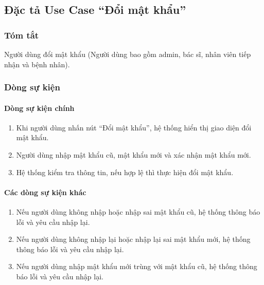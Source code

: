 \subsection{Đặc tả Use Case ``Đổi mật khẩu''}

\subsubsection{Tóm tắt}
Người dùng đổi mật khẩu (Người dùng bao gồm admin, bác sĩ, nhân viên tiếp nhận và bệnh nhân).

\subsubsection{Dòng sự kiện}
\paragraph{\textbf{Dòng sự kiện chính}}
\begin{enumerate}
    \item Khi người dùng nhấn nút ``Đổi mật khẩu'', hệ thống hiển thị giao diện đổi mật khẩu.
    \item Người dùng nhập mật khẩu cũ, mật khẩu mới và xác nhận mật khẩu mới.
    \item Hệ thống kiểm tra thông tin, nếu hợp lệ thì thực hiện đổi mật khẩu.
\end{enumerate}

\paragraph{\textbf{Các dòng sự kiện khác}}
\begin{enumerate}
    \item Nếu người dùng không nhập hoặc nhập sai mật khẩu cũ, hệ thống thông báo lỗi và yêu cầu nhập lại.
    \item Nếu người dùng không nhập lại hoặc nhập lại sai mật khẩu mới, hệ thống thông báo lỗi và yêu cầu nhập lại.
    \item Nếu người dùng nhập mật khẩu mới trùng với mật khẩu cũ, hệ thống thông báo lỗi và yêu cầu nhập lại.
\end{enumerate}

